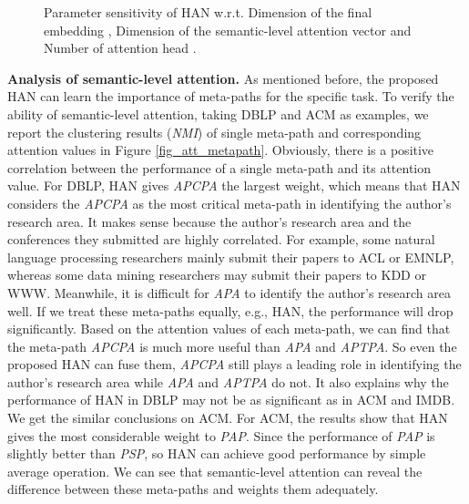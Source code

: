 \begin{figure*}
	\centering
	\caption{Parameter sensitivity of HAN w.r.t. Dimension of the final embedding ,  Dimension of the semantic-level attention vector  and Number of attention head .}
	\label{fig_para2}
\end{figure*}


\textbf{Analysis of semantic-level attention.} 
As mentioned before, the proposed HAN can learn the importance of meta-paths for the specific task.
To verify the ability of semantic-level attention, taking DBLP and ACM as examples, we report the clustering results (\emph{NMI}) of single meta-path and corresponding attention values in Figure \ref{fig_att_metapath}. Obviously, there is a positive correlation between the performance of a single meta-path and its attention value. 
For DBLP, HAN gives \emph{APCPA} the largest weight, which means that HAN considers the \emph{APCPA} as the most critical meta-path in identifying the author's research area. It makes sense because the author's research area and the conferences they submitted are highly correlated. For example, some natural language processing researchers mainly submit their papers to ACL or EMNLP, whereas some data mining researchers may submit their papers to KDD or WWW.
Meanwhile, it is difficult for \emph{APA} to identify the author's research area well. If we treat these meta-paths equally, e.g., HAN, the performance will drop significantly. 
Based on the attention values of each meta-path, we can find that the meta-path \emph{APCPA} is much more useful than \emph{APA} and \emph{APTPA}. So even the proposed HAN can fuse them, \emph{APCPA} still plays a leading role in identifying the author's research area  while \emph{APA} and \emph{APTPA} do not.
It also explains why the performance of HAN in DBLP may not be as significant as in ACM and IMDB.
We get the similar conclusions on ACM.
For ACM, the results show that HAN gives the most considerable weight to \emph{PAP}. Since the performance of \emph{PAP} is slightly better than \emph{PSP}, so HAN can achieve good performance by simple average operation. We can see that semantic-level attention can reveal the difference between these meta-paths and weights them adequately.


